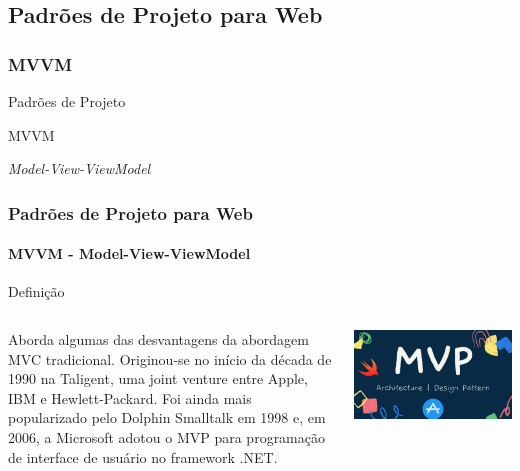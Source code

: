 \documentclass[
	10pt, %
	t, %
]{beamer}
\begin{document}

\subsection{Padrões de Projeto para Web}
\subsubsection{MVVM}

\begin{frame}
	\begin{center}
		
		\bigskip\bigskip\bigskip\bigskip %
		{\Large Padrões de Projeto}
		
		\bigskip\bigskip %
		{\Huge MVVM}
		
		\smallskip
		{\small \textit{Model-View-ViewModel}}
	\end{center}

\end{frame}

\begin{frame}
	\frametitle{Padrões de Projeto para Web}
	\framesubtitle{MVVM - Model-View-ViewModel}

	\begin{block}{Definição}
	\begin{columns}[c] %
			\begin{column}{0.8\textwidth} %
				Aborda algumas das desvantagens da abordagem MVC tradicional. Originou-se no início da década de 1990 na Taligent, uma joint venture entre Apple, IBM e Hewlett-Packard. Foi ainda mais popularizado pelo Dolphin Smalltalk em 1998 e, em 2006, a Microsoft adotou o MVP para programação de interface de usuário no framework .NET.
			\end{column}

			\begin{column}{0.2\textwidth} %
				\includegraphics[width=0.9\linewidth]{Images/mvp_logo.jpg}
			\end{column}
		\end{columns}
	\end{block}

\end{frame}
\end{document}
